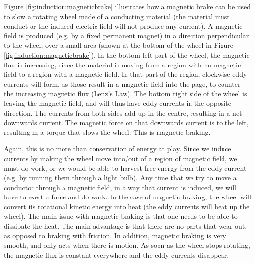 Figure \ref{fig:induction:magneticbrake} illustrates how a magnetic brake can be used to slow a rotating wheel made of a conducting material (the material must conduct or the induced electric field will not produce any current). A magnetic field is produced (e.g. by a fixed permanent magnet) in a direction perpendicular to the wheel, over a small area (shown at the bottom of the wheel in Figure \ref{fig:induction:magneticbrake}).
In the bottom left part of the wheel, the magnetic flux is increasing, since the material is moving from a region with no magnetic field to a region with a magnetic field. In that part of the region, clockwise eddy currents will form, as those result in a magnetic field into the page, to counter the increasing magnetic flux (Lenz's Law). The bottom right side of the wheel is leaving the magnetic field, and will thus have eddy currents in the opposite direction. The currents from both sides add up in the centre, resulting in a net downwards current. The magnetic force on that downwards current is to the left, resulting in a torque that slows the wheel. This is magnetic braking.

Again, this is no more than conservation of energy at play. Since we induce currents by making the wheel move into/out of a region of magnetic field, we must do work, or we would be able to harvest free energy from the eddy current (e.g. by running them through a light bulb). Any time that we try to move a conductor through a magnetic field, in a way that current is induced, we will have to exert a force and do work. In the case of magnetic braking, the wheel will convert its rotational kinetic energy into heat (the eddy currents will heat up the wheel). The main issue with magnetic braking is that one needs to be able to dissipate the heat. The main advantage is that there are no parts that wear out, as opposed to braking with friction. In addition, magnetic braking is very smooth, and only acts when there is motion. As soon as the wheel stops rotating, the magnetic flux is constant everywhere and the eddy currents disappear.


